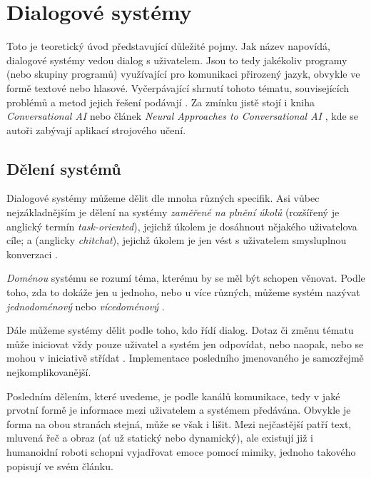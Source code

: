
\chapter{Dialogové systémy}\label{chapter-theory}

Toto je teoretický úvod představující důležité pojmy.
Jak název napovídá, dialogové systémy vedou dialog s uživatelem. Jsou to
tedy jakékoliv programy (nebo skupiny programů) využívající
pro komunikaci přirozený jazyk, obvykle ve formě textové nebo hlasové.
Vyčerpávající shrnutí tohoto tématu, souvisejících problémů a metod
jejich řešení podávají \citet{jurafsky_slp_2020}. Za zmínku jistě stojí
i kniha \textit{Conversational AI} \citep{mctear_conversational_2020} nebo
článek \textit{Neural Approaches to Conversational AI} \citep{gao_neural_2019},
kde se autoři zabývají aplikací strojového učení.

\section{Dělení systémů}
Dialogové systémy můžeme dělit dle mnoha různých specifik. Asi vůbec
nejzákladnějším je dělení na systémy \textit{zaměřené na plnění úkolů}
(rozšířený je anglický termín \textit{task-oriented}), jejichž úkolem
je dosáhnout nějakého uživatelova cíle; a  (anglicky
\textit{chitchat}), jejichž úkolem je jen vést s uživatelem smysluplnou
konverzaci \citep[strana 6]{gao_neural_2019}.

\textit{Doménou} systému se rozumí téma, kterému by se měl být schopen
věnovat. Podle toho, zda to dokáže jen u jednoho, nebo u více různých,
můžeme systém nazývat \textit{jednodoménový} nebo \textit{vícedoménový} \citep[strana 47]{gao_neural_2019}.

Dále můžeme systémy dělit podle toho, kdo řídí dialog. Dotaz či změnu tématu
může iniciovat vždy pouze uživatel a systém jen odpovídat, nebo naopak, nebo
se mohou v iniciativě střídat \citep[strany 495-496]{jurafsky_slp_2020}. Implementace posledního jmenovaného je samozřejmě
nejkomplikovanější.

Posledním dělením, které uvedeme, je podle kanálů komunikace, tedy
v jaké prvotní formě je informace mezi uživatelem a systémem předávána.
Obvykle je forma na obou stranách stejná, může se však i lišit. Mezi
nejčastější patří text, mluvená řeč a obraz (ať už statický nebo
dynamický), ale existují již i humanoidní roboti schopni vyjadřovat emoce pomocí
mimiky, jednoho takového popisují \citet{faraj_facially_2021} ve svém článku.


